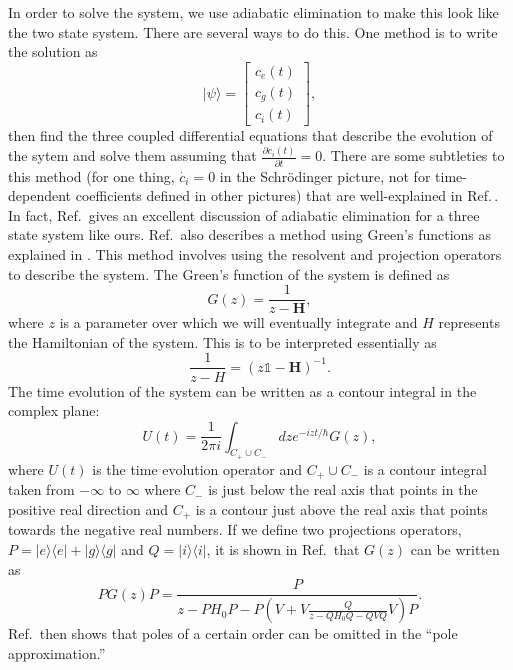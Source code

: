 In order to solve the system, we use adiabatic elimination to make this look like the two state system. There are several ways to do this. One method is to write the solution as 
\begin{equation} 
|\psi\rangle = 
\begin{bmatrix}c_e(t)\\c_g(t)\\c_i(t)
\end{bmatrix},
\end{equation}
then find the three coupled differential equations that describe the evolution of the sytem and solve them assuming that $\frac{\partial c_i(t)}{\partial t}=0$. There are some subtleties to this method (for one thing, $\dot{c_i}=0$ in the Schr\"odinger picture, not for time-dependent coefficients defined in other pictures) that are well-explained in Ref.\,\cite{brionLambdaAdiabatic}. In fact, Ref.\,\cite{brionLambdaAdiabatic} gives an excellent discussion of adiabatic elimination for a three state system like ours. 
Ref.\,\cite{brionLambdaAdiabatic} also describes a method using Green's functions as explained in \cite{cohenTannoudji}. This method involves using the resolvent and projection operators to describe the system. The Green's function of the system is defined as 
\begin{equation}
G(z)=\frac{1}{z-\mathbf{H}},
\end{equation}
where $z$ is a parameter over which we will eventually integrate and $H$ represents the Hamiltonian of the system. This is to be interpreted essentially as 
\begin{equation}
\frac{1}{z-H}=\left(z\mathds{1}-\mathbf{H}\right)^{-1}.
\end{equation}
The time evolution of the system can be written as a contour integral in the complex plane:
\begin{equation}
U(t)=\frac{1}{2\pi i}\int_{C_+\cup C_-}dz e^{-izt/\hbar}G(z),
\end{equation}
where $U(t)$ is the time evolution operator and $C_+\cup C_-$ is a contour integral taken from $-\infty$ to $\infty$ where $C_-$ is just below the real axis that points in the positive real direction and $C_+$ is a contour just above the real axis that points towards the negative real numbers. 
If we define two projections operators, $P=|e\rangle\langle e| + |g\rangle\langle g|$ and $Q=|i\rangle\langle i|$, it is shown in Ref.\,\cite{cohenTannoudji} that $G(z)$ can be written as 
\begin{equation}
PG(z)P=\frac{P}{z-PH_0P-P\left(V+V\frac{Q}{z-QH_0Q-QVQ}V\right)P}.
\end{equation}
Ref.\,\cite{brionLambdaAdiabatic} then shows that poles of a certain order can be omitted in the ``pole approximation.'' 

